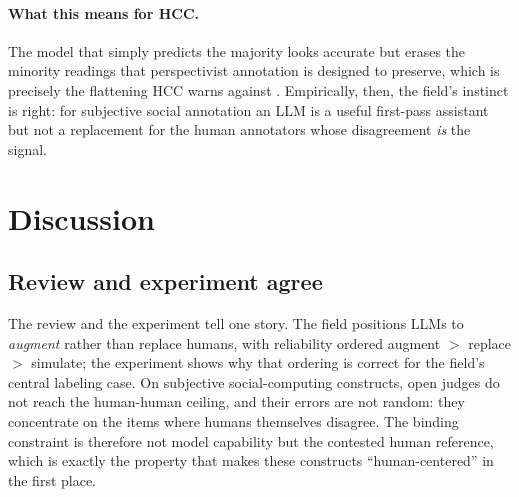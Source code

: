 \paragraph{What this means for HCC.} The model that simply predicts the majority looks accurate but erases the
minority readings that perspectivist annotation is designed to preserve, which is precisely the flattening HCC warns
against \citep{wang2024flatten,fricker2007epistemic}. Empirically, then, the field's instinct is right: for
subjective social annotation an LLM is a useful first-pass assistant but not a replacement for the human annotators
whose disagreement \emph{is} the signal.
\section{Discussion}
\subsection{Review and experiment agree}
The review and the experiment tell one story. The field positions LLMs to \emph{augment} rather than replace humans,
with reliability ordered augment $>$ replace $>$ simulate; the experiment shows why that ordering is correct for the
field's central labeling case. On subjective social-computing constructs, open judges do not reach the human-human
ceiling, and their errors are not random: they concentrate on the items where humans themselves disagree. The
binding constraint is therefore not model capability but the contested human reference, which is exactly the
property that makes these constructs ``human-centered'' in the first place.

